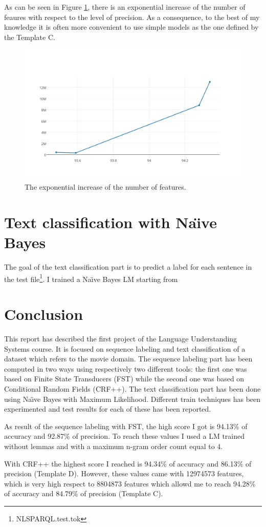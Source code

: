 \documentclass[a4paper,7pt,oneside]{book}
\newcommand\chap[1]{\chapter*{#1}\addcontentsline{toc}{chapter}{\protect\numberline{}#1}}
\begin{document}
As can be seen in Figure \ref{fig:crf_exp_num_features}, there is an exponential increase of the number of feaures with respect to the level of precision. As a consequence, to the best of my knowledge it is often more convenient to use simple models as the one defined by the Template C.

\begin{figure}[h]
  \centering
    \includegraphics[scale=0.5]{res/crf_exp_num_features}
    \caption{The exponential increase of the number of features.}
    \label{fig:crf_exp_num_features}
\end{figure}

\chapter{Text classification with Na\"{\i}ve Bayes}

The goal of the text classification part is to predict a label for each sentence in the test file\footnote{NLSPARQL.test.tok}. I trained a Na\"{\i}ve Bayes LM starting from 

\chap{Conclusion}

This report has described the first project of the Language Understanding Systems course. It is focused on sequence labeling and text classification of a dataset which refers to the movie domain. The sequence labeling part has been computed in two ways using respectively two different tools: the first one was based on Finite State Transducers (FST) while the second one was based on Conditional Random Fields (CRF++). The text classification part has been done using Na\"{\i}ve Bayes with Maximum Likelihood. Different train techniques has been experimented and test results for each of these has been reported.

As result of the sequence labeling with FST, the high score I got is 94.13\% of accuracy and 92.87\% of precision. To reach these values I used a LM trained without lemmas and with a maximum n-gram order count equal to 4.

With CRF++ the highest score I reached is 94.34\% of accuracy and 86.13\% of precision (Template D). However, these values came with 12974573 features, which is very high respect to 8804873 features which allowd me to reach 94.28\% of accuracy and 84.79\% of precision (Template C).
\end{document}
